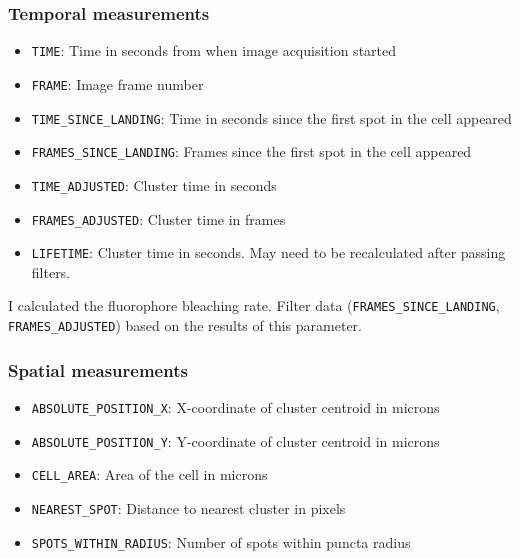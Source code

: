 \subsubsection{Temporal measurements}
\begin{itemize}
\item \texttt{TIME}: Time in seconds from when image acquisition started
\item \texttt{FRAME}: Image frame number
\item \texttt{TIME\_SINCE\_LANDING}: Time in seconds since the first spot in the cell appeared
\item \texttt{FRAMES\_SINCE\_LANDING}: Frames since the first spot in the cell appeared
\item \texttt{TIME\_ADJUSTED}: Cluster time in seconds
\item \texttt{FRAMES\_ADJUSTED}: Cluster time in frames
\item \texttt{LIFETIME}: Cluster time in seconds. May need to be recalculated after passing filters.
\end{itemize}

I calculated the fluorophore bleaching rate. Filter data (\texttt{FRAMES\_SINCE\_LANDING}, \texttt{FRAMES\_ADJUSTED}) based on the results of this parameter.

\subsubsection{Spatial measurements}
\begin{itemize}
\item \texttt{ABSOLUTE\_POSITION\_X}: X-coordinate of cluster centroid in microns
\item \texttt{ABSOLUTE\_POSITION\_Y}: Y-coordinate of cluster centroid in microns
\item \texttt{CELL\_AREA}: Area of the cell in microns
\item \texttt{NEAREST\_SPOT}: Distance to nearest cluster in pixels
\item \texttt{SPOTS\_WITHIN\_RADIUS}: Number of spots within puncta radius
\end{itemize}

